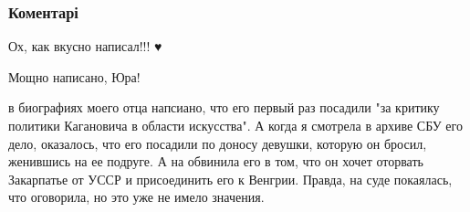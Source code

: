  
 
 
 
 
\subsubsection{Коментарі}
\label{sec:09_08_2021.fb.molchanov_jurij.1.psihologia_nenavist.cmt}

\begin{itemize}
 
Ох, как вкусно написал!!! ♥️

 
Мощно написано, Юра!

 

в биографиях моего отца напсиано, что его первый раз посадили "за критику
политики Кагановича в области искусства". А когда я смотрела в архиве СБУ его
дело, оказалось, что его посадили по доносу девушки, которую он бросил,
женившись на ее подруге. А на обвинила его в том, что он хочет оторвать
Закарпатье от УССР и присоединить его к Венгрии. Правда, на суде покаялась, что
оговорила, но это уже не имело значения.

\begin{itemize}
 

\end{itemize}
\end{itemize}
